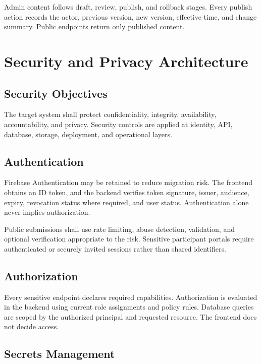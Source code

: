 \documentclass[11pt,a4paper,oneside]{report}
\begin{document}
Admin content follows draft, review, publish, and rollback stages. Every publish action records the actor, previous version, new version, effective time, and change summary. Public endpoints return only published content.

\chapter{Security and Privacy Architecture}

\section{Security Objectives}

The target system shall protect confidentiality, integrity, availability, accountability, and privacy. Security controls are applied at identity, API, database, storage, deployment, and operational layers.

\section{Authentication}

Firebase Authentication may be retained to reduce migration risk. The frontend obtains an ID token, and the backend verifies token signature, issuer, audience, expiry, revocation status where required, and user status. Authentication alone never implies authorization.

Public submissions shall use rate limiting, abuse detection, validation, and optional verification appropriate to the risk. Sensitive participant portals require authenticated or securely invited sessions rather than shared identifiers.

\section{Authorization}

Every sensitive endpoint declares required capabilities. Authorization is evaluated in the backend using current role assignments and policy rules. Database queries are scoped by the authorized principal and requested resource. The frontend does not decide access.

\section{Secrets Management}
\end{document}
